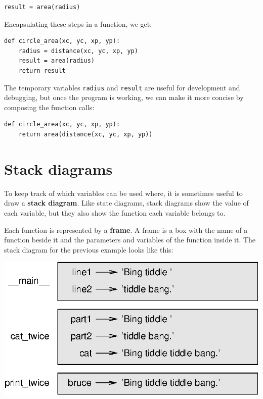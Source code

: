 \beforeverb
\begin{verbatim}
result = area(radius)
\end{verbatim}
\afterverb
%
Encapsulating these steps in a function, we get:


\beforeverb
\begin{verbatim}
def circle_area(xc, yc, xp, yp):
    radius = distance(xc, yc, xp, yp)
    result = area(radius)
    return result
\end{verbatim}
\afterverb
%
The temporary variables {\tt radius} and {\tt result} are useful for
development and debugging, but once the program is working, we can
make it more concise by composing the function calls:

\beforeverb
\begin{verbatim}
def circle_area(xc, yc, xp, yp):
    return area(distance(xc, yc, xp, yp))
\end{verbatim}
\afterverb
%

\section{Stack diagrams}
\label{stackdiagram}

To keep track of which variables can be used where, it is sometimes
useful to draw a {\bf stack diagram}.  Like state diagrams, stack
diagrams show the value of each variable, but they also show the
function each variable belongs to.


Each function is represented by a {\bf frame}.  A frame is a box
with the name of a function
beside it and the parameters and variables of the function inside it.
The stack diagram for the
previous example looks like this:

\beforefig
\centerline{\includegraphics{figs/stack.eps}}
\afterfig

